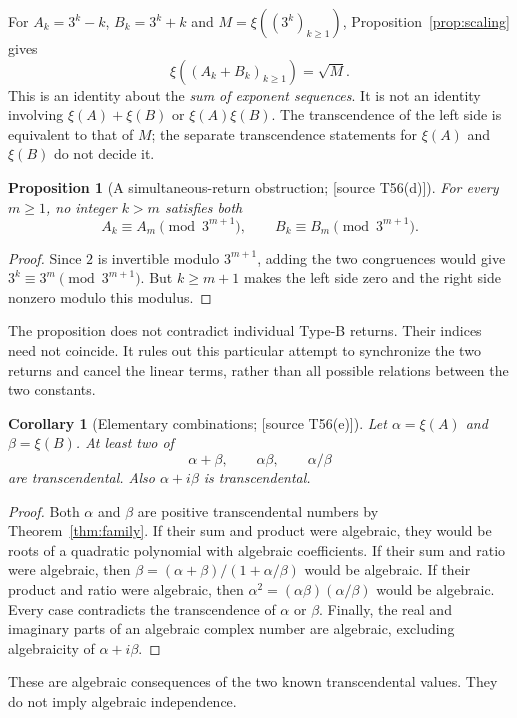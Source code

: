 \documentclass[11pt,a4paper]{article}
\newtheorem{proposition}[theorem]{Proposition}
\newtheorem{corollary}[theorem]{Corollary}
\theoremstyle{definition}\newtheorem{definition}[theorem]{Definition}
\theoremstyle{remark}\newtheorem{remark}[theorem]{Remark}
\newcommand{\sourceT}[1]{\textup{[source T#1]}}
\begin{document}
For $A_k=3^k-k$, $B_k=3^k+k$ and $M=\xi((3^k)_{k\ge1})$,
Proposition~\ref{prop:scaling} gives
\begin{equation}\label{eq:Millsboundary}
 \xi((A_k+B_k)_{k\ge1})=\sqrt M.
\end{equation}
This is an identity about the \emph{sum of exponent sequences}. It is
not an identity involving $\xi(A)+\xi(B)$ or $\xi(A)\xi(B)$.
The transcendence of the left side is equivalent to that of $M$;
the separate transcendence statements for $\xi(A)$ and $\xi(B)$ do
not decide it.

\begin{proposition}[A simultaneous-return obstruction;
\sourceT{56(d)}]\label{prop:sync}
For every $m\ge1$, no integer $k>m$ satisfies both
\[
 A_k\equiv A_m\pmod{3^{m+1}},\qquad
 B_k\equiv B_m\pmod{3^{m+1}}.
\]
\end{proposition}
\begin{proof}
Since $2$ is invertible modulo $3^{m+1}$, adding the two congruences
would give $3^k\equiv3^m\pmod{3^{m+1}}$. But $k\ge m+1$ makes
the left side zero and the right side nonzero modulo this modulus.
\end{proof}

The proposition does not contradict individual Type-B returns. Their
indices need not coincide. It rules out this particular attempt to
synchronize the two returns and cancel the linear terms, rather than
all possible relations between the two constants.

\begin{corollary}[Elementary combinations; \sourceT{56(e)}]
\label{cor:combinations}
Let $\alpha=\xi(A)$ and $\beta=\xi(B)$. At least two of
\[
 \alpha+\beta,\qquad \alpha\beta,\qquad \alpha/\beta
\]
are transcendental. Also $\alpha+i\beta$ is transcendental.
\end{corollary}
\begin{proof}
Both $\alpha$ and $\beta$ are positive transcendental numbers by
Theorem~\ref{thm:family}. If their sum and product were algebraic,
they would be roots of a quadratic polynomial with algebraic
coefficients. If their sum and ratio were algebraic, then
$\beta=(\alpha+\beta)/(1+\alpha/\beta)$ would be algebraic.
If their product and ratio were algebraic, then
$\alpha^2=(\alpha\beta)(\alpha/\beta)$ would be algebraic.
Every case contradicts the transcendence of $\alpha$ or $\beta$.
Finally, the real and imaginary parts of an algebraic complex number
are algebraic, excluding algebraicity of $\alpha+i\beta$.
\end{proof}
These are algebraic consequences of the two known transcendental
values. They do not imply algebraic independence.
\end{document}
